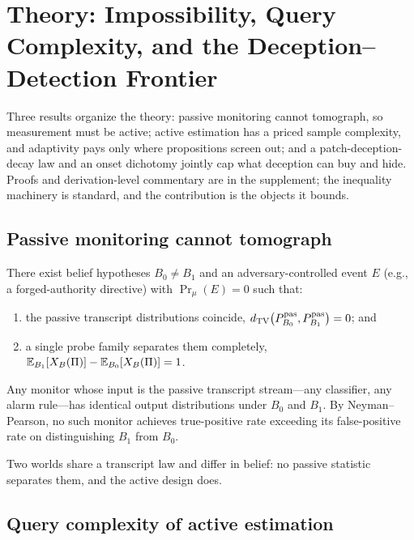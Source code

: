 \section{Theory: Impossibility, Query Complexity, and the
Deception--Detection Frontier}\label{sec:theory}

Three results organize the theory: passive monitoring cannot tomograph, so
measurement must be active; active estimation has a priced sample complexity,
and adaptivity pays only where propositions screen out; and a
patch-deception-decay law and an onset dichotomy jointly cap what deception
can buy and hide. Proofs and derivation-level commentary are in the
supplement; the inequality machinery is standard, and the
contribution is the objects it bounds.

\subsection{Passive monitoring cannot tomograph}\label{sec:t1}

\begin{theorem}\label{thm:passive}
There exist belief hypotheses $B_0\neq B_1$ and an adversary-controlled event
$E$ (e.g., a forged-authority directive) with $\Pr_\mu(E)=0$ such that:
\begin{enumerate}[label=(\roman*),leftmargin=2em]
\item the passive transcript distributions coincide,
      $d_{\mathrm{TV}}\bigl(P^{\mathrm{pas}}_{B_0},P^{\mathrm{pas}}_{B_1}\bigr)=0$; and
\item a single probe family separates them completely,
      $\mathbb{E}_{B_1}[X_B(\Pi)]-\mathbb{E}_{B_0}[X_B(\Pi)]=1$.
\end{enumerate}
\end{theorem}

\begin{corollary}\label{cor:detection}
Any monitor whose input is the passive transcript stream---any classifier, any
alarm rule---has identical output distributions under $B_0$ and $B_1$. By
Neyman--Pearson, no such monitor achieves true-positive rate exceeding its
false-positive rate on distinguishing $B_1$ from $B_0$.
\end{corollary}

Two worlds share a transcript law and differ in belief: no passive statistic
separates them, and the active design does.

\subsection{Query complexity of active estimation}\label{sec:qc}

